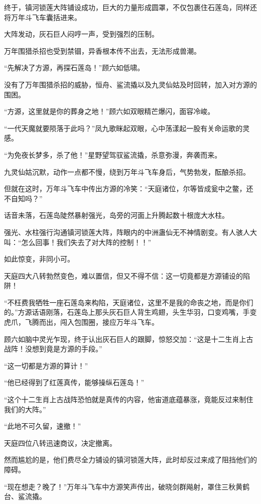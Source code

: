\begin{this_body}
终于，镇河锁莲大阵铺设成功，巨大的力量形成圆罩，不仅包裹住石莲岛，同样还将万年斗飞车囊括进来。

大阵发动，灰石巨人闷哼一声，受到强烈的压制。

万年围猎杀招也受到禁锢，异香根本传不出去，无法形成兽潮。

“先解决了方源，再探石莲岛！”顾六如低啸。

没有了万年围猎杀招的威胁，恒舟、鲨流撬以及九灵仙姑及时回转，加入对方源的围困。

“方源，这里就是你的葬身之地！”顾六如双眼精芒爆闪，面容冷峻。

“一代天魔就要陨落于此吗？”凤九歌眯起双眼，心中荡漾起一股有关命运歌的灵感。

“为免夜长梦多，杀了他！”星野望驾驭鲨流撬，杀意弥漫，奔袭而来。

九灵仙姑沉默，动作一点都不慢，绕到万年斗飞车身后，气势勃发，酝酿杀招。

但就在这时，万年斗飞车中传出方源的冷笑：“天庭诸位，尔等皆成瓮中之鳖，还不自知吗？”

话音未落，石莲岛陡然暴射强光，岛旁的河面上升腾起数十根庞大水柱。

强光、水柱强行沟通镇河锁莲大阵，阵眼内的中洲蛊仙无不神情剧变。有人骇人大叫：“怎么回事！我们失去了对大阵的控制！！”

如此惊变，非同小可。

天庭四大八转勃然变色，难以置信，但又不得不信：这一切竟都是方源铺设的陷阱！

“不枉费我牺牲一座石莲岛来构陷，天庭诸位，这里不是我的命丧之地，而是你们的。”方源话语刚落，石莲岛上那头灰石巨人背生鸡翅，头生华羽，口变鸡嘴，手变虎爪，飞腾而出，闯入包围圈，接应万年斗飞车。

顾六如脑中灵光乍现，终于认出灰石巨人的跟脚，惊怒交加：“这是十二生肖上古战阵！没想到竟是方源的手段。”

“这一切都是方源的算计！”

“他已经得到了红莲真传，能够操纵石莲岛！”

“这个十二生肖上古战阵恐怕就是真传的内容，他宙道底蕴暴涨，竟能反过来制住我们的大阵。”

“此地不可久留，速撤！”

天庭四位八转迅速商议，决定撤离。

然而尴尬的是，他们费尽全力铺设的镇河锁莲大阵，此时却反过来成了阻挡他们的障碍。

“现在想走？晚了！”万年斗飞车中方源笑声传出，破晓剑群飚射，罩住三秋黄鹤台、鲨流撬。


\end{this_body}

